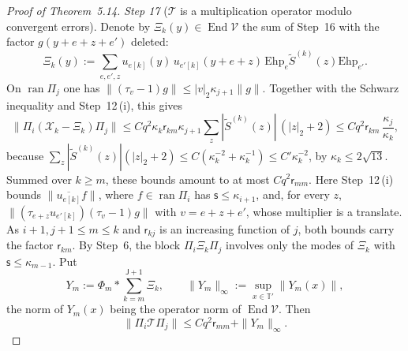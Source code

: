 \documentclass[11pt]{amsart}
\theoremstyle{definition}
\begin{document}
\begin{proof}[Proof of Theorem~5.14]
\emph{Step 17} ($\mathcal T$ is a multiplication operator modulo convergent errors).
Denote by $\Xi_k(y)\in\operatorname{End}\mathcal V$ the sum of Step~16 with the factor $g(y+e+z+e')$ deleted:
\begin{equation*}
\Xi_k(y):=\sum_{e,e',z}u_{e[k]}(y)\,u_{e'[k]}(y+e+z)\,\mathrm{Ehp}_e\tilde S^{(k)}(z)\mathrm{Ehp}_{e'}.
\end{equation*}
On $\operatorname{ran}\Pi_j$ one has $\|(\tau_v-1)g\|\le|v|_2\kappa_{j+1}\|g\|$.
Together with the Schwarz inequality and Step~12\,(i), this gives
\begin{equation*}
\|\Pi_i(\mathcal X_k-\Xi_k)\Pi_j\|\le Cq^2\kappa_k\mathsf r_{km}\kappa_{j+1}\sum_z|\tilde S^{(k)}(z)|\,(|z|_2+2)\le Cq^2\mathsf r_{km}\,\frac{\kappa_j}{\kappa_k},
\end{equation*}
because $\sum_z|\tilde S^{(k)}(z)|(|z|_2+2)\le C(\kappa_k^{-2}+\kappa_k^{-1})\le C'\kappa_k^{-2}$, by $\kappa_k\le2\sqrt{13}$.
Summed over $k\ge m$, these bounds amount to at most $Cq^2\mathsf r_{mm}$.
Here Step~12\,(i) bounds $\|\overline{u_{e[k]}}f\|$, where $f\in\operatorname{ran}\Pi_i$ has $\mathsf s\le\kappa_{i+1}$, and, for every $z$, $\|(\tau_{e+z}u_{e'[k]})(\tau_v-1)g\|$ with $v=e+z+e'$, whose multiplier is a translate.
As $i+1,j+1\le m\le k$ and $\mathsf r_{kj}$ is an increasing function of $j$, both bounds carry the factor $\mathsf r_{km}$.
By Step~6, the block $\Pi_i\Xi_k\Pi_j$ involves only the modes of $\Xi_k$ with $\mathsf s\le\kappa_{m-1}$.
Put
\begin{equation*}
Y_m:=\Phi_m*\sum_{k=m}^{\mathsf J+1}\Xi_k,\qquad\|Y_m\|_\infty:=\sup_{x\in\mathbb T'}\|Y_m(x)\|,
\end{equation*}
the norm of $Y_m(x)$ being the operator norm of $\operatorname{End}\mathcal V$.
Then
\begin{equation*}
\|\Pi_i\mathcal T\Pi_j\|\le Cq^2\mathsf r_{mm}+\|Y_m\|_\infty.
\end{equation*}


\end{proof}
\end{document}
